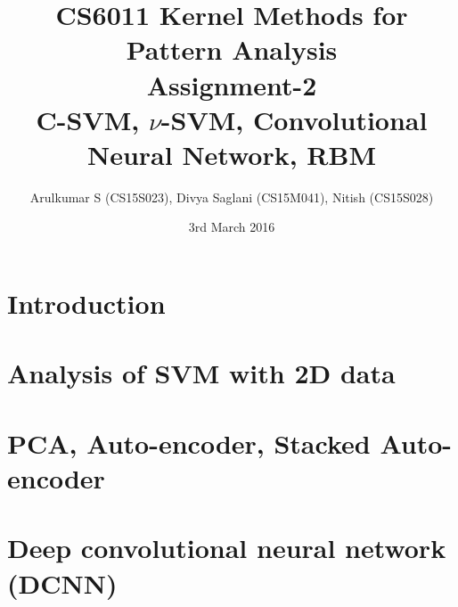 \documentclass[fleqn]{article}
\title{CS6011 Kernel Methods for Pattern Analysis\\ Assignment-2 \\C-SVM, $\nu$-SVM, Convolutional Neural Network, RBM}
\author{Arulkumar S (CS15S023), Divya Saglani (CS15M041), Nitish (CS15S028)}
\date{3rd March 2016}
\begin{document}
\setcounter{secnumdepth}{5}
\tracingall
\maketitle

\section{Introduction}
\section{Analysis of SVM with 2D data}
\section{PCA, Auto-encoder, Stacked Auto-encoder}

\newpage
\section{Deep convolutional neural network (DCNN)}
\end{document}
